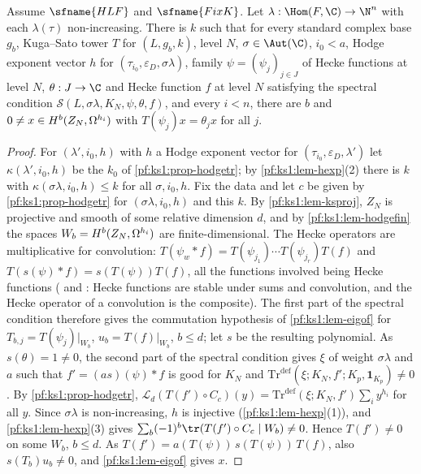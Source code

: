 \begin{proposition}\label{pf:ks1:prop-hodgeeig}
Assume $\sfname{HLF}$ and $\sfname{FixK}$. Let $\lambda:\Hom(F,\C)\to\N^n$ with each $\lambda(\tau)$ non-increasing. There is $k$ such that for every
standard complex base $g_b$, Kuga--Sato tower $T$ for $(L,g_b,k)$, level $N$, $\sigma\in\Aut(\C)$, $i_0<a$, Hodge exponent vector $h$ for
$(\tau_{i_0},\varepsilon_D,\sigma\lambda)$, family $\psi=(\psi_j)_{j\in J}$ of Hecke functions at level $N$, $\theta:J\to\C$ and Hecke function $f$ at level $N$
satisfying the spectral condition $\mathcal S(L,\sigma\lambda,K_N,\psi,\theta,f)$, and every $i<n$, there are $b$ and $0\neq x\in\ksoneH{Z_N}{h_i}{b}$ with
$T(\psi_j)x=\theta_jx$ for all $j$.
\end{proposition}

\begin{proof}
For $(\lambda',i_0,h)$ with $h$ a Hodge exponent vector for $(\tau_{i_0},\varepsilon_D,\lambda')$ let $\kappa(\lambda',i_0,h)$ be the $k_0$ of
\cref{pf:ks1:prop-hodgetr}; by \cref{pf:ks1:lem-hexp}(2) there is $k$ with $\kappa(\sigma\lambda,i_0,h)\le k$ for all $\sigma,i_0,h$. Fix the data and let
$c$ be given by \cref{pf:ks1:prop-hodgetr} for $(\sigma\lambda,i_0,h)$ and this $k$. By \cref{pf:ks1:lem-ksproj}, $Z_N$ is projective and smooth of some relative
dimension $d$, and by \cref{pf:ks1:lem-hodgefin} the spaces $W_b=\ksoneH{Z_N}{h_i}{b}$ are finite-dimensional. The Hecke operators are multiplicative
for convolution: $T(\psi_w*f)=T(\psi_{j_1})\cdots T(\psi_{j_r})T(f)$ and $T(s(\psi)*f)=s(T(\psi))T(f)$, all the functions involved being Hecke functions
( and : Hecke functions are stable under sums and convolution, and
the Hecke operator of a convolution is the composite). The first part of the spectral condition therefore gives the commutation hypothesis of
\cref{pf:ks1:lem-eigof} for $T_{b,j}=T(\psi_j)|_{W_b}$, $u_b=T(f)|_{W_b}$, $b\le d$; let $s$ be the resulting polynomial. As $s(\theta)=1\neq0$, the second part
of the spectral condition gives $\xi$ of weight $\sigma\lambda$ and $a$ such that $f'=(as)(\psi)*f$ is good for $K_N$ and
$\mathrm{Tr}^{\mathrm{def}}(\xi;K_N,f';K_p,\mathbf 1_{K_p})\neq0$. By \cref{pf:ks1:prop-hodgetr},
$\mathcal L_d(T(f')\circ C_c)(y)=\mathrm{Tr}^{\mathrm{def}}(\xi;K_N,f')\sum_iy^{h_i}$ for all $y$. Since $\sigma\lambda$ is non-increasing, $h$ is injective
(\cref{pf:ks1:lem-hexp}(1)), and \cref{pf:ks1:lem-hexp}(3) gives $\sum_b(-1)^b\tr(T(f')\circ C_c\mid W_b)\neq0$. Hence $T(f')\neq0$ on some $W_b$, $b\le d$.
As $T(f')=a(T(\psi))\,s(T(\psi))\,T(f)$, also $s(T_b)u_b\neq0$, and \cref{pf:ks1:lem-eigof} gives $x$.
\end{proof}

